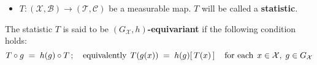 \begin{definition}
\begin{itemize}
	\item $T : (\mathcal{X},\mathcal{B}) \longrightarrow (\mathcal{T},\mathcal{C})$ be a measurable
	      map.  $T$ will be called a \textbf{statistic}.
\end{itemize}
The statistic $T$ is said to be \textbf{$(G_{\mathcal{X}},h)$-equivariant} if the following
condition holds:
\begin{equation*}
T \circ g \; = \; h(g)\circ T \,;
\quad\textnormal{equivalently}\,\;
T(g(x)) \; = \; h(g)\!\left[\,T(x)\,\right]
\quad\textnormal{for each}\;\, x \in \mathcal{X}, \; g \in G_{\mathcal{X}}
\end{equation*}
\end{definition}
